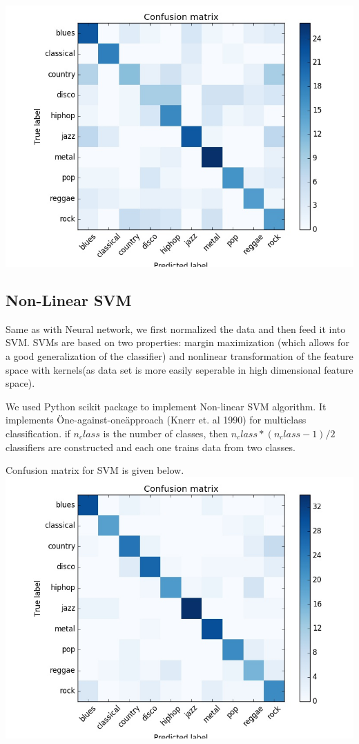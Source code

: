 \documentclass[conference]{IEEEtran}
\begin{document}
\includegraphics[width=\columnwidth]{ANN}
\subsection{Non-Linear SVM}
\label{subs:Non-Linear SVM}
Same as with Neural network, we first normalized the data and then feed it into SVM. SVMs are based on two properties: margin maximization (which allows for a good generalization of the classifier) and nonlinear transformation of the feature space with kernels(as data set is more easily seperable in high dimensional feature space).


We used Python scikit package to implement Non-linear SVM algorithm. It implements \"One-against-one\" approach (Knerr et. al 1990) for multiclass classification. if $n_class$ is the number of classes, then $n_class * (n_class - 1 ) / 2$ classifiers are constructed and each one trains data from two classes.

Confusion matrix for SVM is given below.
\includegraphics[width=\columnwidth]{SVM}
\end{document}
